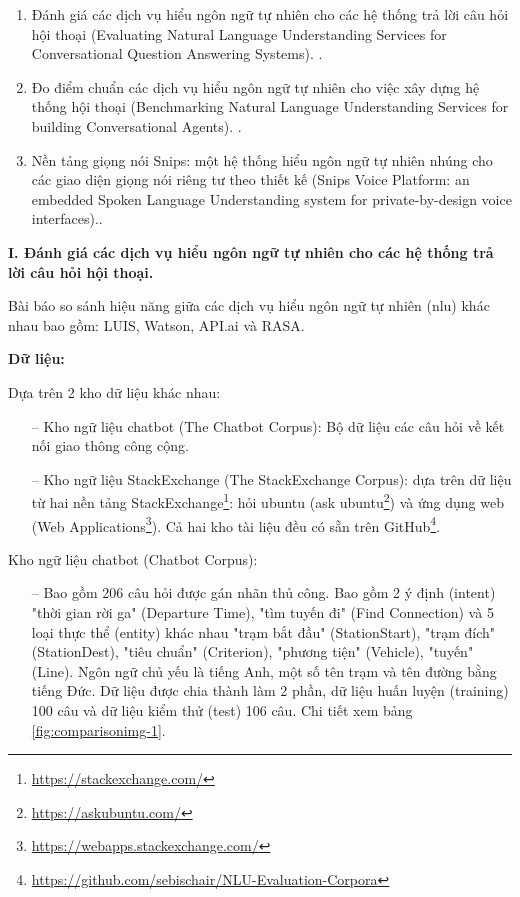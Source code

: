 \begin{enumerate}
    \item Đánh giá các dịch vụ hiểu ngôn ngữ tự nhiên cho các hệ thống trả lời câu hỏi hội thoại (Evaluating Natural Language Understanding Services for Conversational Question Answering Systems). \cite{EvaluatingNLU}.
    \item Đo điểm chuẩn các dịch vụ hiểu ngôn ngữ tự nhiên cho việc xây dựng hệ thống hội thoại (Benchmarking Natural Language Understanding Services for building Conversational Agents). \cite{BenchmarkingNLU}.
    \item Nền tảng giọng nói Snips: một hệ thống hiểu ngôn ngữ tự nhiên nhúng cho các giao diện giọng nói riêng tư theo thiết kế (Snips Voice Platform: an embedded Spoken Language Understanding system for private-by-design voice interfaces).\cite{snips-nlu}.
\end{enumerate}

\textbf{I. Đánh giá các dịch vụ hiểu ngôn ngữ tự nhiên cho các hệ thống trả lời câu hỏi hội thoại.}

Bài báo so sánh hiệu năng giữa các dịch vụ hiểu ngôn ngữ tự nhiên (\ac{nlu}) khác nhau bao gồm: LUIS, Watson, API.ai và RASA.

\textbf{Dữ liệu:}

Dựa trên 2 kho dữ liệu khác nhau:
\begin{itemize}
    \item[--] Kho ngữ liệu chatbot (The Chatbot Corpus): Bộ dữ liệu các câu hỏi về kết nối giao thông công cộng.
    \item[--] Kho ngữ liệu StackExchange (The StackExchange Corpus): dựa trên dữ liệu từ hai nền tảng StackExchange\footnote{\url{https://stackexchange.com/}}: hỏi ubuntu (ask ubuntu\footnote{\url{https://askubuntu.com/}}) và ứng dụng web (Web Applications\footnote{\url{https://webapps.stackexchange.com/}}). Cả hai kho tài liệu đều có sẵn trên GitHub\footnote{\url{https://github.com/sebischair/NLU-Evaluation-Corpora}}.
\end{itemize}

Kho ngữ liệu chatbot (Chatbot Corpus):

\begin{itemize}
    \item[--] Bao gồm 206 câu hỏi được gán nhãn thủ công. Bao gồm 2 ý định (intent) "thời gian rời ga" (Departure Time), "tìm tuyến đi" (Find Connection) và 5 loại thực thể (entity) khác nhau "trạm bắt đầu" (StationStart), "trạm đích"  (StationDest), "tiêu chuẩn" (Criterion), "phương tiện" (Vehicle), "tuyến" (Line). Ngôn ngữ chủ yếu là tiếng Anh, một số tên trạm và tên đường bằng tiếng Đức. Dữ liệu được chia thành làm 2 phần, dữ liệu huấn luyện (training) 100 câu và dữ liệu kiểm thử (test) 106 câu. Chi tiết xem bảng \ref{fig:comparisonimg-1}.
\end{itemize}


